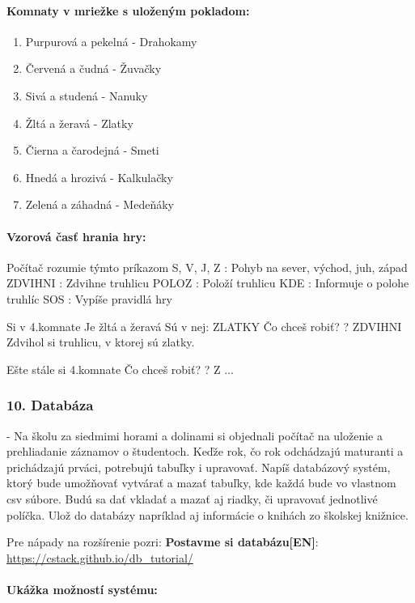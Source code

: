 \paragraph{Komnaty v mriežke s uloženým pokladom:}
\begin{enumerate}
\itemsep0pt
\item Purpurová a pekelná - Drahokamy
\item Červená a čudná - Žuvačky
\item Sivá a studená - Nanuky
\item Žltá a žeravá - Zlatky
\item Čierna a čarodejná - Smeti
\item Hnedá a hrozivá - Kalkulačky
\item Zelená a záhadná - Medeňáky
\end{enumerate}
   
\paragraph{Vzorová časť hrania hry:}

\begin{code}
Počítač rozumie týmto príkazom
S, V, J, Z   : Pohyb na sever, východ, juh, západ
ZDVIHNI		 : Zdvihne truhlicu
POLOZ		 : Položí truhlicu
KDE			 : Informuje o polohe truhlíc
SOS			 : Vypíše pravidlá hry

Si v 4.komnate
Je žltá a žeravá
Sú v nej: ZLATKY
Čo chceš robiť?
? ZDVIHNI
Zdvihol si truhlicu, v ktorej sú zlatky.

Ešte stále si 4.komnate
Čo chceš robiť?
? Z
...
\end{code}

\subsubsection*{10. Databáza} - Na školu za siedmimi horami a dolinami si objednali počítač na uloženie a prehliadanie záznamov o študentoch. Keďže rok, čo rok odchádzajú maturanti a prichádzajú prváci, potrebujú tabuľky i upravovať. Napíš databázový systém, ktorý bude umožňovať vytvárať a mazať tabuľky, kde každá bude vo vlastnom csv súbore. Budú sa dať vkladať a mazať aj riadky, či upravovať jednotlivé políčka. Ulož do databázy napríklad aj informácie o knihách zo školskej knižnice.

Pre nápady na rozšírenie pozri: \textbf{Postavme si databázu[EN]}: \url{https://cstack.github.io/db_tutorial/}

\paragraph{Ukážka možností systému:}

